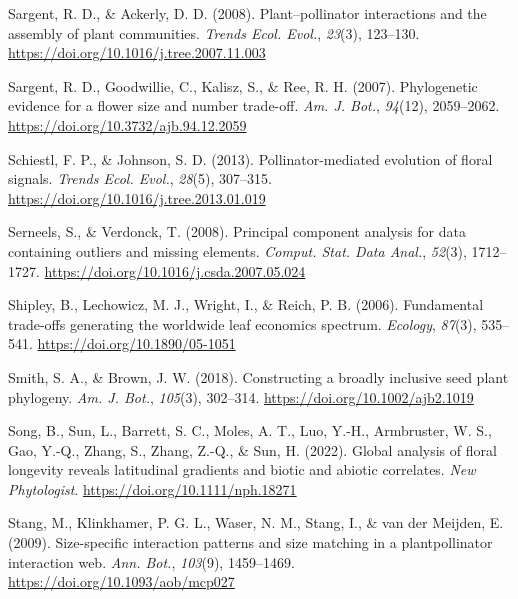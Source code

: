 \documentclass[
  12pt,
  a4paper,
]{article}
\newlength{\cslhangindent}
\newlength{\cslentryspacingunit} %
\newenvironment{CSLReferences}[2] %
 {%
  \setlength{\parindent}{0pt}
  \ifodd #1
  \let\oldpar\par
  \def\par{\hangindent=\cslhangindent\oldpar}
  \fi
  \setlength{\parskip}{#2\cslentryspacingunit}
 }%
 {}
\begin{document}
\begin{CSLReferences}{1}{0}
\leavevmode{}%
Sargent, R. D., \& Ackerly, D. D. (2008). Plant--pollinator interactions and the assembly of plant communities. \emph{Trends Ecol. Evol.}, \emph{23}(3), 123--130. \url{https://doi.org/10.1016/j.tree.2007.11.003}

\leavevmode{}%
Sargent, R. D., Goodwillie, C., Kalisz, S., \& Ree, R. H. (2007). Phylogenetic evidence for a flower size and number trade-off. \emph{Am. J. Bot.}, \emph{94}(12), 2059--2062. \url{https://doi.org/10.3732/ajb.94.12.2059}

\leavevmode{}%
Schiestl, F. P., \& Johnson, S. D. (2013). Pollinator-mediated evolution of floral signals. \emph{Trends Ecol. Evol.}, \emph{28}(5), 307--315. \url{https://doi.org/10.1016/j.tree.2013.01.019}

\leavevmode{}%
Serneels, S., \& Verdonck, T. (2008). Principal component analysis for data containing outliers and missing elements. \emph{Comput. Stat. Data Anal.}, \emph{52}(3), 1712--1727. \url{https://doi.org/10.1016/j.csda.2007.05.024}

\leavevmode{}%
Shipley, B., Lechowicz, M. J., Wright, I., \& Reich, P. B. (2006). Fundamental trade-offs generating the worldwide leaf economics spectrum. \emph{Ecology}, \emph{87}(3), 535--541. \url{https://doi.org/10.1890/05-1051}

\leavevmode{}%
Smith, S. A., \& Brown, J. W. (2018). Constructing a broadly inclusive seed plant phylogeny. \emph{Am. J. Bot.}, \emph{105}(3), 302--314. \url{https://doi.org/10.1002/ajb2.1019}

\leavevmode{}%
Song, B., Sun, L., Barrett, S. C., Moles, A. T., Luo, Y.-H., Armbruster, W. S., Gao, Y.-Q., Zhang, S., Zhang, Z.-Q., \& Sun, H. (2022). Global analysis of floral longevity reveals latitudinal gradients and biotic and abiotic correlates. \emph{New Phytologist}. \url{https://doi.org/10.1111/nph.18271}

\leavevmode{}%
Stang, M., Klinkhamer, P. G. L., Waser, N. M., Stang, I., \& van der Meijden, E. (2009). Size-specific interaction patterns and size matching in a plant\textendash pollinator interaction web. \emph{Ann. Bot.}, \emph{103}(9), 1459--1469. \url{https://doi.org/10.1093/aob/mcp027}


\end{CSLReferences}
\end{document}
